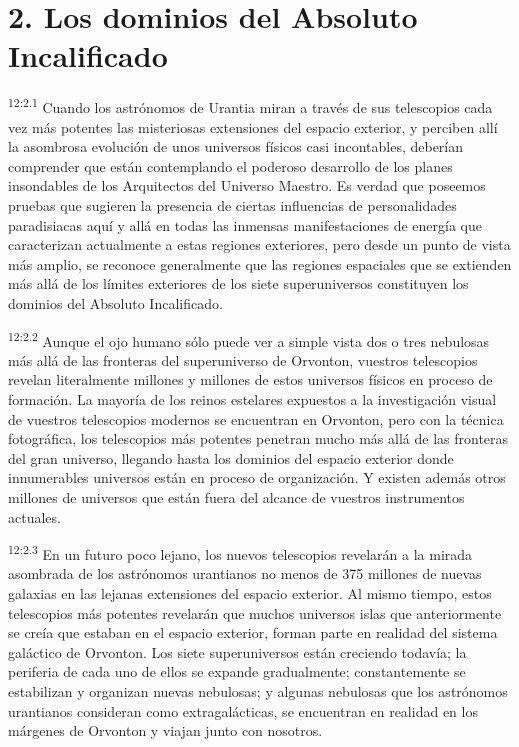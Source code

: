 \section*{2. Los dominios del Absoluto Incalificado}
\par
\textsuperscript{12:2.1} Cuando los astrónomos de Urantia miran a través de sus telescopios cada vez más potentes las misteriosas extensiones del espacio exterior, y perciben allí la asombrosa evolución de unos universos físicos casi incontables, deberían comprender que están contemplando el poderoso desarrollo de los planes insondables de los Arquitectos del Universo Maestro. Es verdad que poseemos pruebas que sugieren la presencia de ciertas influencias de personalidades paradisiacas aquí y allá en todas las inmensas manifestaciones de energía que caracterizan actualmente a estas regiones exteriores, pero desde un punto de vista más amplio, se reconoce generalmente que las regiones espaciales que se extienden más allá de los límites exteriores de los siete superuniversos constituyen los dominios del Absoluto Incalificado.

\par
\textsuperscript{12:2.2} Aunque el ojo humano sólo puede ver a simple vista dos o tres nebulosas más allá de las fronteras del superuniverso de Orvonton, vuestros telescopios revelan literalmente millones y millones de estos universos físicos en proceso de formación. La mayoría de los reinos estelares expuestos a la investigación visual de vuestros telescopios modernos se encuentran en Orvonton, pero con la técnica fotográfica, los telescopios más potentes penetran mucho más allá de las fronteras del gran universo, llegando hasta los dominios del espacio exterior donde innumerables universos están en proceso de organización. Y existen además otros millones de universos que están fuera del alcance de vuestros instrumentos actuales.

\par
\textsuperscript{12:2.3} En un futuro poco lejano, los nuevos telescopios revelarán a la mirada asombrada de los astrónomos urantianos no menos de 375 millones de nuevas galaxias en las lejanas extensiones del espacio exterior. Al mismo tiempo, estos telescopios más potentes revelarán que muchos universos islas que anteriormente se creía que estaban en el espacio exterior, forman parte en realidad del sistema galáctico de Orvonton. Los siete superuniversos están creciendo todavía; la periferia de cada uno de ellos se expande gradualmente; constantemente se estabilizan y organizan nuevas nebulosas; y algunas nebulosas que los astrónomos urantianos consideran como extragalácticas, se encuentran en realidad en los márgenes de Orvonton y viajan junto con nosotros.

